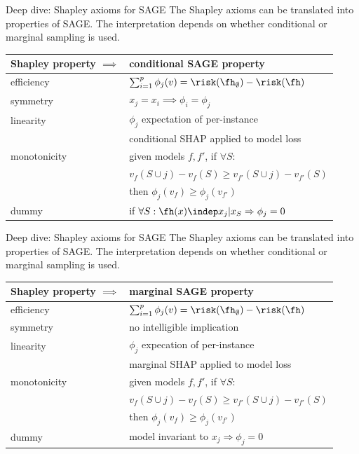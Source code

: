 \documentclass[10pt,compress,t,notes=noshow, xcolor=table]{beamer}
\begin{document}
\begin{framev}[align=top]{Deep dive: Shapley axioms for SAGE}
The Shapley axioms can be translated into properties of SAGE. The interpretation depends on whether conditional or marginal sampling is used.
%
\begin{table}
\centering
\begin{tabular}{l | l }
Shapley property $\implies$ & conditional SAGE property \\
\hline
efficiency & $\sum_{i=1}^p \phi_j(v) = \risk(\fh_\emptyset) - \risk(\fh)$\\ %
symmetry & $x_j = x_i \implies \phi_i = \phi_j$ \\
linearity & $\phi_j$ expectation of per-instance\\
& conditional SHAP applied to model loss\\ %
monotonicity & given models $f, f'$, if  $\forall S:$\\
&$v_f(S \cup j) - v_f(S) \geq v_{f'}(S \cup j) - v_{f'}(S)$ \\
&then $\phi_j(v_f) \geq \phi_j(v_{f'})$\\ %
dummy & if $\forall S: \fh(x) \indep x_j | x_S \Rightarrow \phi_j = 0$
\end{tabular}
\end{table}
\end{framev}


\begin{framev}[align=top]{Deep dive: Shapley axioms for SAGE}
%
The Shapley axioms can be translated into properties of SAGE. The interpretation depends on whether conditional or marginal sampling is used.
%
\begin{table}
\centering
\begin{tabular}{l | l }
Shapley property $\implies$ & marginal SAGE property \\
\hline
efficiency & $\sum_{i=1}^p \phi_j(v) = \risk(\fh_\emptyset) - \risk(\fh)$\\
symmetry & no intelligible implication \\
linearity & $\phi_j$ expecation of per-instance\\
& marginal SHAP applied to model loss\\
monotonicity & given models $f, f'$, if  $\forall S:$\\
&$v_f(S \cup j) - v_f(S) \geq v_{f'}(S \cup j) - v_{f'}(S)$ \\
&then $\phi_j(v_f) \geq \phi_j(v_{f'})$\\
dummy & model invariant to $x_j \Rightarrow \phi_j = 0$\\
\end{tabular}
\end{table}
%
\end{framev}

\endlecture
\end{document}
